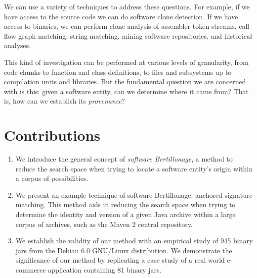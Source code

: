 We can use a variety of techniques to address these questions.  For
example, if we have access to the source code we can do software clone
detection. If we have access to binaries, we can perform clone analysis of
assembler token streams, call flow graph matching, string matching, mining
software repositories, and historical analyses.

This kind of investigation can be performed at various levels of
granularity, from code chunks to function and class definitions, to files
and subsystems up to compilation units and libraries.  But the fundamental
question we are concerned with is this:  given a software entity, can we
determine where it came from?  That is, how can we establish its
\emph{provenance}?

\section{Contributions}

\begin{enumerate}
\item We introduce the general concept of \emph{software Bertillonage}, a
    method to reduce the search space when trying to locate a software
    entity's origin within a corpus of possibilities.

\vspace{0.7em}
\item We present an example technique of software Bertillonage: anchored
    signature matching.  This method aids in reducing the search space when
    trying to determine the identity and version of a given Java archive
    within a large
    corpus of archives, such as the Maven 2 central repository.

\vspace{0.7em}
\item We establish the validity of our method with an empirical study
    of 945 binary jars from the Debian 6.0 GNU/Linux distribution.
    We demonstrate the significance of our method by replicating
    a case study
    of a %
    real world e-commerce application containing 81 binary jars.

\end{enumerate}




